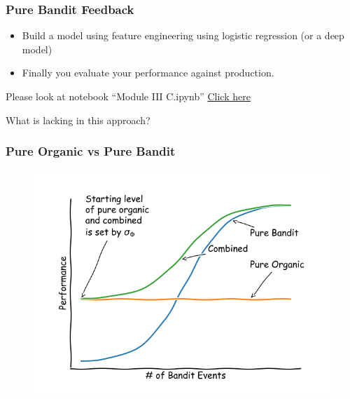 \begin{frame}
  \frametitle{Pure Bandit Feedback}

    \begin{itemize}
      \item Build a model using feature engineering using logistic regression (or a deep model) \pause
      \item Finally you evaluate your performance against production.
    \end{itemize}

    \pause
    Please look at notebook ``Module III C.ipynb''
    \href{https://colab.research.google.com/github/criteo-research/reco-gym/blob/DS3/Module\%20III\%20C.ipynb}{Click here}


    \pause
    What is lacking in this approach?

\end{frame}






\begin{frame}
  \frametitle{Pure Organic vs Pure Bandit}
\begin{figure}[h!]
\includegraphics[scale=0.45]{images/pureorganicpurebandit.png}
\centering
\end{figure}
\end{frame}






